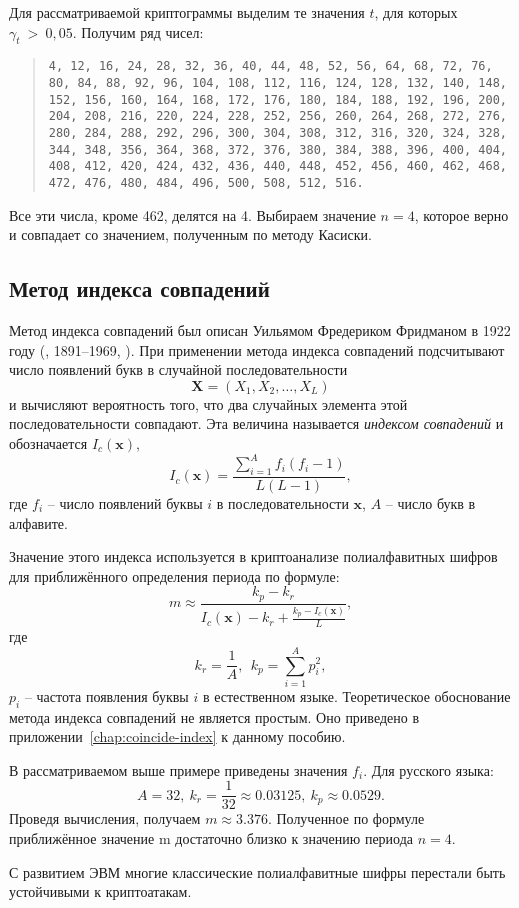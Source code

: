 \example
Для рассматриваемой криптограммы выделим те значения $t$, для которых $\gamma _t~>~0{,}05.$ Получим ряд чисел:

\begin{quote}
    \noindent \texttt{4, 12, 16, 24, 28, 32, 36, 40, 44, 48, 52, 56, 64, 68, 72, 76, 80, 84, 88, 92, 96, 104, 108, 112, 116, 124, 128, 132, 140, 148, 152, 156, 160, 164, 168, 172, 176, 180, 184, 188, 192, 196, 200, 204, 208, 216, 220, 224, 228, 252, 256, 260, 264, 268, 272, 276, 280, 284, 288, 292, 296, 300, 304, 308, 312, 316, 320, 324, 328, 344, 348, 356, 364, 368, 372, 376, 380, 384, 388, 396, 400, 404, 408, 412, 420, 424, 432, 436, 440, 448, 452, 456, 460, 462, 468, 472, 476, 480, 484, 496, 500, 508, 512, 516.}
\end{quote}

Все эти числа, кроме 462, делятся на 4. Выбираем значение $n=4$, которое верно и совпадает со значением, полученным по методу Касиски.
\exampleend


\subsection{Метод индекса совпадений}

Метод индекса совпадений был описан Уильямом Фредериком Фридманом в 1922 году (, 1891--1969, \cite{Friedman:1922}). При применении метода индекса совпадений подсчитывают число появлений букв в случайной последовательности
    \[ \mathbf{X} = (X_1 ,X_2 , \ldots , X_L ) \]
и вычисляют вероятность того, что два случайных элемента этой последовательности совпадают. Эта величина называется \emph{индексом совпадений} и обозначается $I_{c}(\mathbf{x}),$ 
    \[ I_{c} (\mathbf{x}) = \frac{{\sum\limits_{i = 1}^A {f_i (f_i  - 1)} }} {{L(L - 1)}}, \]
    где
$f_{i}$ -- число появлений буквы $i$ в последовательности $\mathbf{x}$, $A$ -- число букв в алфавите.

Значение этого индекса используется в криптоанализе полиалфавитных шифров для приближённого определения периода по формуле:
    \[ m \approx \frac{{k_p  - k_r }} {{I_{c} (\mathbf{x}) - k_r  + \frac{{k_p  - I_{c} (\mathbf{x})}} {L}}}, \]
где
    \[ k_r  = \frac{1}{A}, ~~ k_p  = \sum\limits_{i=1}^A p_i^2, \]
$p_i $ -- частота появления буквы $i$ в естественном языке.
Теоретическое обоснование метода индекса совпадений не является простым. Оно приведено в приложении~\ref{chap:coincide-index} к данному пособию.

\example
В рассматриваемом выше примере приведены значения $f_{i}$. Для русского языка:
    \[ A=32, ~ k_{r} = \frac{1}{32} \approx 0.03125, ~ k_{p} \approx 0.0529. \]
Проведя вычисления, получаем $m \approx 3.376$. Полученное по формуле приближённое значение m достаточно близко к значению периода $n=4$.
\exampleend 

С развитием ЭВМ многие классические полиалфавитные шифры перестали быть устойчивыми к криптоатакам.
